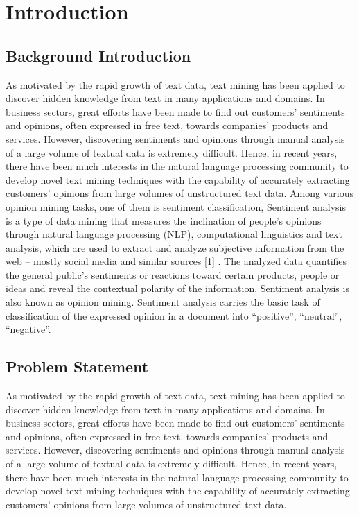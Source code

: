      \chapter{Introduction}
        \section{Background Introduction}
       
            As motivated by the rapid growth of text data, text mining has been applied to discover
hidden knowledge from text in many applications and domains. In business sectors,
great efforts have been made to find out customers’ sentiments and opinions, often
expressed in free text, towards companies’ products and services. However, discovering
sentiments and opinions through manual analysis of a large volume of textual data is
extremely difficult. Hence, in recent years, there have been much interests in the natural
language processing community to develop novel text mining techniques with the
capability of accurately extracting customers’ opinions from large volumes of
unstructured text data. Among various opinion mining tasks, one of them is sentiment
classification, Sentiment analysis is a type of data mining that measures the inclination
of people’s opinions through natural language processing (NLP), computational
linguistics and text analysis, which are used to extract and analyze subjective
information from the web – mostly social media and similar sources
[1]
. The analyzed
data quantifies the general public’s sentiments or reactions toward certain products,
people or ideas and reveal the contextual polarity of the information. Sentiment analysis
is also known as opinion mining. Sentiment analysis carries the basic task of
classification of the expressed opinion in a document into “positive”, “neutral”,
“negative”.
        \section{Problem Statement}
            As motivated by the rapid growth of text data, text mining has been applied to discover
hidden knowledge from text in many applications and domains. In business sectors,
great efforts have been made to find out customers’ sentiments and opinions, often
expressed in free text, towards companies’ products and services. However, discovering
sentiments and opinions through manual analysis of a large volume of textual data is
extremely difficult. Hence, in recent years, there have been much interests in the natural
language processing community to develop novel text mining techniques with the
capability of accurately extracting customers’ opinions from large volumes of
unstructured text data.

